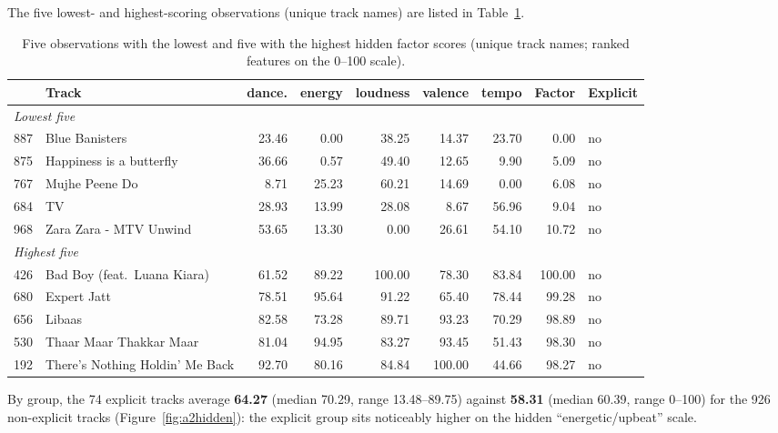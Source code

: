 \documentclass[11pt,letterpaper]{article}
\begin{document}
The five lowest- and highest-scoring observations (unique track names) are
listed in Table~\ref{tab:a2rankends}.

\begin{table}[H]
\centering
\caption{Five observations with the lowest and five with the highest hidden
factor scores (unique track names; ranked features on the 0--100 scale).}
\label{tab:a2rankends}
\footnotesize
\setlength{\tabcolsep}{4.5pt}
\begin{tabular}{rlrrrrrrl}
\toprule
 & Track & dance. & energy & loudness & valence & tempo & Factor & Explicit \\
\midrule
\multicolumn{9}{l}{\textit{Lowest five}} \\
887 & Blue Banisters            & 23.46 &  0.00 & 38.25 & 14.37 & 23.70 &  0.00 & no \\
875 & Happiness is a butterfly  & 36.66 &  0.57 & 49.40 & 12.65 &  9.90 &  5.09 & no \\
767 & Mujhe Peene Do            &  8.71 & 25.23 & 60.21 & 14.69 &  0.00 &  6.08 & no \\
684 & TV                        & 28.93 & 13.99 & 28.08 &  8.67 & 56.96 &  9.04 & no \\
968 & Zara Zara - MTV Unwind    & 53.65 & 13.30 &  0.00 & 26.61 & 54.10 & 10.72 & no \\
\midrule
\multicolumn{9}{l}{\textit{Highest five}} \\
426 & Bad Boy (feat.\ Luana Kiara) & 61.52 & 89.22 & 100.00 & 78.30 & 83.84 & 100.00 & no \\
680 & Expert Jatt                & 78.51 & 95.64 & 91.22 & 65.40 & 78.44 & 99.28 & no \\
656 & Libaas                     & 82.58 & 73.28 & 89.71 & 93.23 & 70.29 & 98.89 & no \\
530 & Thaar Maar Thakkar Maar    & 81.04 & 94.95 & 83.27 & 93.45 & 51.43 & 98.30 & no \\
192 & There's Nothing Holdin' Me Back & 92.70 & 80.16 & 84.84 & 100.00 & 44.66 & 98.27 & no \\
\bottomrule
\end{tabular}
\end{table}

By group, the 74 explicit tracks average \textbf{64.27} (median 70.29, range
13.48--89.75) against \textbf{58.31} (median 60.39, range 0--100) for the 926
non-explicit tracks (Figure~\ref{fig:a2hidden}): the explicit group sits
noticeably higher on the hidden ``energetic/upbeat'' scale.
\end{document}
